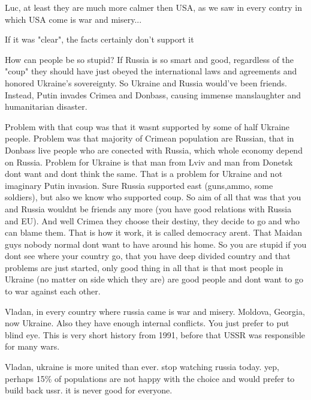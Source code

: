 \begin{itemize}
\begin{itemize}
Luc, at least they are much more calmer then USA, as we saw in every contry in which USA come is war and misery...

If it was "clear", the facts certainly don't support it


How can people be so stupid? If Russia is so smart and good, regardless of the
"coup" they should have just obeyed the international laws and agreements and
honored Ukraine's sovereignty. So Ukraine and Russia would've been friends.
Instead, Putin invades Crimea and Donbass, causing immense manslaughter and
humanitarian disaster.


Problem with that coup was that it wasnt supported by some of half Ukraine
people. Problem was that majority of Crimean population are Russian, that in
Donbass live people who are conected with Russia, which whole economy depend on
Russia. Problem for Ukraine is that man from Lviv and man from Donetsk dont
want and dont think the same. That is a problem for Ukraine and not imaginary
Putin invasion. Sure Russia supported east (guns,ammo, some soldiers), but also
we know who supported coup. So aim of all that was that you and Russia wouldnt
be friends any more (you have good relations with Russia and EU). And well
Crimea they choose their destiny, they decide to go and who can blame them.
That is how it work, it is called democracy arent. That Maidan guys nobody
normal dont want to have around his home. So you are stupid if you dont see
where your country go, that you have deep divided country and that problems are
just started, only good thing in all that is that most people in Ukraine (no
matter on side which they are) are good people and dont want to go to war
against each other.


Vladan, in every country where russia came is war and misery. Moldova, Georgia,
now Ukraine. Also they have enough internal conflicts. You just prefer to put
blind eye. This is very short history from 1991, before that USSR was
responsible for many wars.


Vladan, ukraine is more united than ever. stop watching russia today. yep,
perhaps 15\% of populations are not happy with the choice and would prefer to
build back ussr. it is never good for everyone.



\end{itemize}
\end{itemize}
